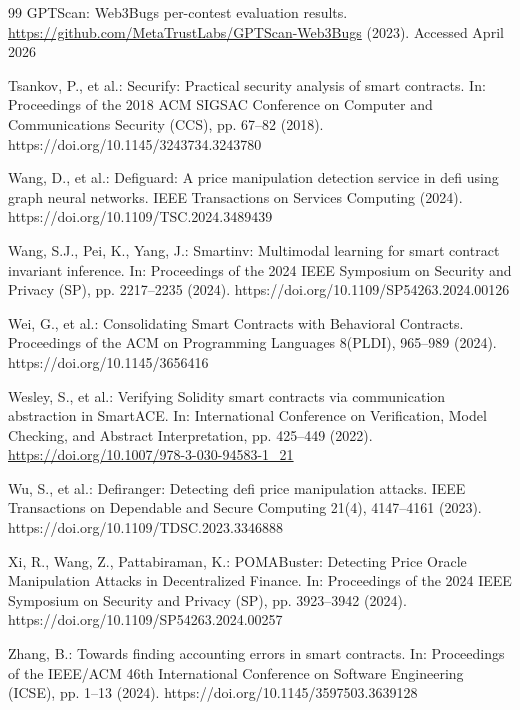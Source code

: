 \documentclass[pdflatex,sn-basic]{sn-jnl}%
\theoremstyle{thmstyleone}%
\theoremstyle{thmstyletwo}%
\theoremstyle{thmstylethree}%
\begin{document}
\begin{thebibliography}{99}
GPTScan: Web3Bugs per-contest evaluation results. \url{https://github.com/MetaTrustLabs/GPTScan-Web3Bugs} (2023). Accessed April 2026

Tsankov, P., et al.: Securify: Practical security analysis of smart contracts. In: Proceedings of the 2018 ACM SIGSAC Conference on Computer and Communications Security (CCS), pp. 67--82 (2018). https://doi.org/10.1145/3243734.3243780

Wang, D., et al.: Defiguard: A price manipulation detection service in defi using graph neural networks. IEEE Transactions on Services Computing (2024). https://doi.org/10.1109/TSC.2024.3489439

Wang, S.J., Pei, K., Yang, J.: Smartinv: Multimodal learning for smart contract invariant inference. In: Proceedings of the 2024 IEEE Symposium on Security and Privacy (SP), pp. 2217--2235 (2024). https://doi.org/10.1109/SP54263.2024.00126

Wei, G., et al.: Consolidating Smart Contracts with Behavioral Contracts. Proceedings of the ACM on Programming Languages 8(PLDI), 965--989 (2024). https://doi.org/10.1145/3656416

Wesley, S., et al.: Verifying Solidity smart contracts via communication abstraction in SmartACE. In: International Conference on Verification, Model Checking, and Abstract Interpretation, pp. 425--449 (2022). \url{https://doi.org/10.1007/978-3-030-94583-1_21}

Wu, S., et al.: Defiranger: Detecting defi price manipulation attacks. IEEE Transactions on Dependable and Secure Computing 21(4), 4147--4161 (2023). https://doi.org/10.1109/TDSC.2023.3346888

Xi, R., Wang, Z., Pattabiraman, K.: POMABuster: Detecting Price Oracle Manipulation Attacks in Decentralized Finance. In: Proceedings of the 2024 IEEE Symposium on Security and Privacy (SP), pp. 3923--3942 (2024). https://doi.org/10.1109/SP54263.2024.00257

Zhang, B.: Towards finding accounting errors in smart contracts. In: Proceedings of the IEEE/ACM 46th International Conference on Software Engineering (ICSE), pp. 1--13 (2024). https://doi.org/10.1145/3597503.3639128


\end{thebibliography}
\end{document}

